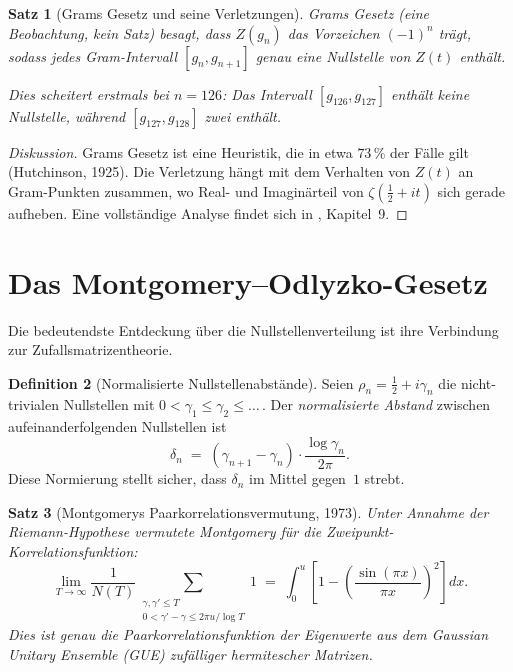 \documentclass[12pt,a4paper]{amsart}
\newtheorem{theorem}{Satz}[section]
\theoremstyle{definition}
\newtheorem{definition}[theorem]{Definition}
\begin{document}
\begin{theorem}[Grams Gesetz und seine Verletzungen]
\label{thm:gram}
\emph{Grams Gesetz} (eine Beobachtung, kein Satz) besagt, dass $Z(g_n)$
das Vorzeichen $(-1)^n$ tr\"agt, sodass jedes Gram-Intervall
$[g_n, g_{n+1}]$ genau eine Nullstelle von $Z(t)$ enth\"alt.

Dies scheitert erstmals bei $n = 126$: Das Intervall
$[g_{126}, g_{127}]$ enth\"alt keine Nullstelle, w\"ahrend
$[g_{127}, g_{128}]$ zwei enth\"alt.
\end{theorem}

\begin{proof}[Diskussion]
Grams Gesetz ist eine Heuristik, die in etwa $73\,\%$ der F\"alle gilt
(Hutchinson, 1925).
Die Verletzung h\"angt mit dem Verhalten von $Z(t)$ an Gram-Punkten zusammen,
wo Real- und Imagin\"arteil von $\zeta(\tfrac{1}{2}+it)$ sich gerade aufheben.
Eine vollst\"andige Analyse findet sich in \cite{Titchmarsh1986}, Kapitel~9.
\end{proof}

\section{Das Montgomery--Odlyzko-Gesetz}

Die bedeutendste Entdeckung \"uber die Nullstellenverteilung ist ihre
Verbindung zur Zufallsmatrizentheorie.

\begin{definition}[Normalisierte Null\-stellen\-abst\"ande]
\label{def:spacing}
Seien $\rho_n = \tfrac{1}{2} + i\gamma_n$ die nicht-trivialen Nullstellen mit
$0 < \gamma_1 \le \gamma_2 \le \ldots$\,.
Der \emph{normalisierte Abstand} zwischen aufeinanderfolgenden Nullstellen ist
\[
  \delta_n \;=\; (\gamma_{n+1} - \gamma_n) \cdot \frac{\log\gamma_n}{2\pi}.
\]
Diese Normierung stellt sicher, dass $\delta_n$ im Mittel gegen~$1$ strebt.
\end{definition}

\begin{theorem}[Montgomerys Paarkorrelationsvermutung, 1973]
\label{thm:montgomery}
Unter Annahme der Riemann-Hypothese vermutete Montgomery \cite{Montgomery1973}
f\"ur die Zweipunkt-Korrelationsfunktion:
\[
  \lim_{T \to \infty} \frac{1}{N(T)}
  \sum_{\substack{\gamma, \gamma' \le T \\ 0 < \gamma'-\gamma \le 2\pi u / \log T}}
  1
  \;=\;
  \int_0^u \left[1 - \left(\frac{\sin(\pi x)}{\pi x}\right)^2\right] dx.
\]
Dies ist genau die Paarkorrelationsfunktion der Eigenwerte aus dem
\emph{Gaussian Unitary Ensemble} (GUE) zuf\"alliger hermitescher Matrizen.
\end{theorem}
\end{document}
